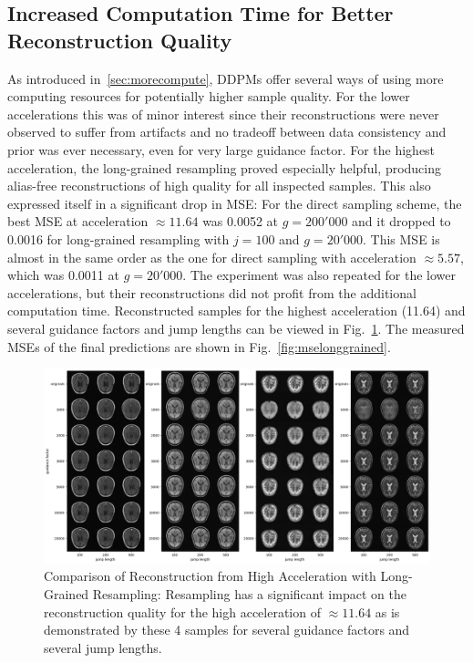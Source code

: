 \subsection{Increased Computation Time for Better Reconstruction Quality}
As introduced in~\ref{sec:morecompute}, DDPMs offer several ways of using more computing resources for potentially higher sample quality. For the lower accelerations this was of minor interest since their reconstructions were never observed to suffer from artifacts and no tradeoff between data consistency and prior was ever necessary, even for very large guidance factor. For the highest acceleration, the long-grained resampling proved especially helpful, producing alias-free reconstructions of high quality for all inspected samples. This also expressed itself in a significant drop in MSE: For the direct sampling scheme, the best MSE at acceleration $\approx 11.64$ was 0.0052 at $g=200'000$ and it dropped to 0.0016 for long-grained resampling with $j=100$ and $g=20'000$. This MSE is almost in the same order as the one for direct sampling with acceleration $\approx 5.57$, which was 0.0011 at $g=20'000$. The experiment was also repeated for the lower accelerations, but their reconstructions did not profit from the additional computation time. Reconstructed samples for the highest acceleration (11.64) and several guidance factors and jump lengths can be viewed in Fig.~\ref{fig:longgrainedmask2}. The measured MSEs of the final predictions are shown in Fig.~\ref{fig:mselonggrained}.
\begin{figure}
    \centering
    \includegraphics[width=\textwidth]{images/msk2_longRes.png}
    \caption[Comparison of Reconstruction from High Acceleration with Long-Grained Resampling]{Comparison of Reconstruction from High Acceleration with Long-Grained Resampling: Resampling has a significant impact on the reconstruction quality for the high acceleration of $\approx 11.64$ as is demonstrated by these 4 samples for several guidance factors and several jump lengths.}
    \label{fig:longgrainedmask2}
\end{figure}
